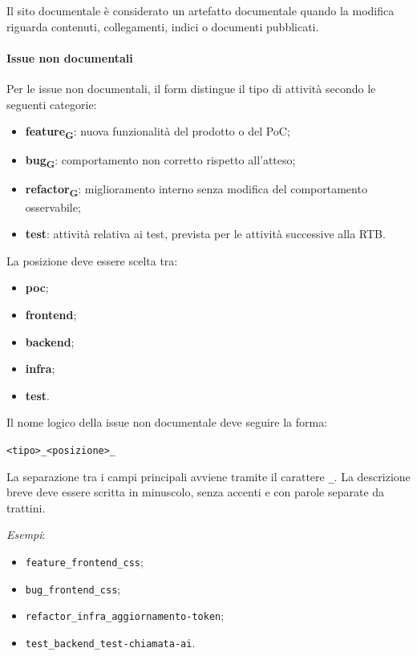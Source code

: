 Il sito documentale è considerato un artefatto documentale quando la modifica
riguarda contenuti, collegamenti, indici o documenti pubblicati.

\paragraph{Issue non documentali}

Per le issue non documentali, il form distingue il tipo di attività secondo le
seguenti categorie:

\begin{itemize}
    \item \textbf{feature\textsubscript{G}}: nuova funzionalità del prodotto o del PoC;
    \item \textbf{bug\textsubscript{G}}: comportamento non corretto rispetto all'atteso;
    \item \textbf{refactor\textsubscript{G}}: miglioramento interno senza modifica del comportamento
    osservabile;
    \item \textbf{test}: attività relativa ai test, prevista per le attività successive
    alla RTB.
\end{itemize}

La posizione deve essere scelta tra:

\begin{itemize}
    \item \textbf{poc};
    \item \textbf{frontend};
    \item \textbf{backend};
    \item \textbf{infra};
    \item \textbf{test}.
\end{itemize}

Il nome logico della issue non documentale deve seguire la forma:

\begin{center}
    \texttt{<tipo>\_<posizione>\_<descrizione-breve>}
\end{center}

La separazione tra i campi principali avviene tramite il carattere
\texttt{\_}. La descrizione breve deve essere scritta in minuscolo, senza accenti
e con parole separate da trattini.

\textit{Esempi}:

\begin{itemize}
    \item \texttt{feature\_frontend\_css};
    \item \texttt{bug\_frontend\_css};
    \item \texttt{refactor\_infra\_aggiornamento-token};
    \item \texttt{test\_backend\_test-chiamata-ai}.
\end{itemize}


